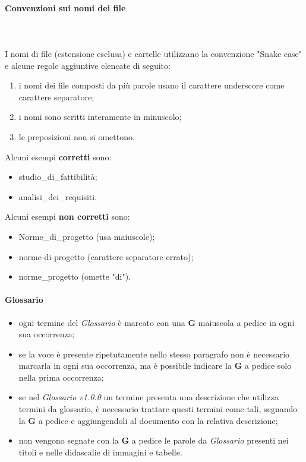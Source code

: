 		\paragraph{Convenzioni sui nomi dei file} \mbox{}\\ \mbox{}\\
		I nomi di file (estensione esclusa) e cartelle utilizzano la convenzione "Snake case\glo" e alcune regole aggiuntive elencate di seguito:
		\begin{enumerate}
			\item i nomi dei file composti da più parole usano il carattere underscore come carattere separatore;
			\item i nomi sono scritti interamente in minuscolo;
			\item le preposizioni non si omettono.
		\end{enumerate}
		Alcuni esempi \textbf{corretti} sono:
		\begin{itemize}
			\item studio\_di\_fattibilità;
			\item analisi\_dei\_requisiti.
		\end{itemize}	 	
		Alcuni esempi \textbf{non corretti} sono: 
		\begin{itemize}
			\item Norme\_di\_progetto (usa maiuscole);
			\item norme-di-progetto (carattere separatore errato);
			\item norme\_progetto (omette "di").
		\end{itemize}
		\paragraph{Glossario}
		\begin{itemize}
			\item ogni termine del \textit{Glossario} è marcato con una \textbf{G} maiuscola a pedice in ogni sua occorrenza;
			\item se la voce è presente ripetutamente nello stesso paragrafo non è necessario marcarla in ogni sua occorrenza, ma è possibile indicare la \textbf{G} a pedice solo nella prima occorrenza;
			\item se nel \textit{Glossario v1.0.0} un termine presenta una descrizione che utilizza termini da glossario, è necessario trattare questi termini come tali, segnando la \textbf{G} a pedice e aggiungendoli al documento con la relativa descrizione;
			\item non vengono segnate con la \textbf{G} a pedice  le parole da \textit{Glossario} presenti nei titoli e nelle didascalie di immagini e tabelle.
		\end{itemize}			
